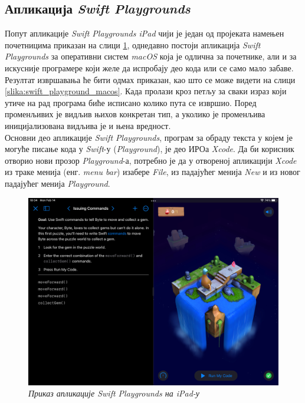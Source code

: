 \documentclass[12pt,oneside]{memoir}
\begin{document}
\subsection{Апликација \textit{Swift Playgrounds}}
\indent Попут апликације \textit{Swift Playgrounds iPad} чији је један од пројеката намењен почетницима приказан на слици \ref{slika:swift_playground_ipad}, однедавно постоји апликација \textit{Swift Playgrounds} за оперативни систем \textit{macOS} која је одлична за почетнике, али и за искусније програмере који желе да испробају део кода или се само мало забаве. Резултат извршавања ће бити одмах приказан, као што се може видети на слици \ref{slika:swift_playground_macos}. Када пролази кроз петљу за сваки израз који утиче на рад програма биће исписано колико пута се извршио. Поред променљивих је видљив њихов конкретан тип, а уколико је променљива иницијализована видљива је и њена вредност.
\\
\indent Основни део апликације \textit{Swift Playgrounds}, програм за обраду текста у којем је могуће писање кода у \textit{Swift}-у (\textit{Playground}), је део ИРОа \textit{Xcode}. Да би корисник отворио нови прозор \textit{Playground}-а, потребно је да у отвореној апликацији \textit{Xcode} из траке менија (енг. \textit{menu bar}) изабере \textit{File}, из падајућег менија \textit{New} и из новог падајућег менија \textit{Playground}.

\begin{figure}[H]
\includegraphics[width=1\textwidth]{images/Swift_Playground_iPad.jpeg}
\centering
\caption{\textit{Приказ апликације Swift Playgrounds на iPad-у}}
\label{slika:swift_playground_ipad}
\end{figure}
\end{document}
